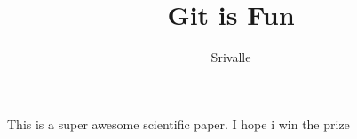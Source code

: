 \documentclass[10pt]{article}
\author{Srivalle}
\title{Git is Fun}
\begin{document}
       \maketitle
       This is a super awesome scientific paper.
       I hope i win the prize
\end{document}
